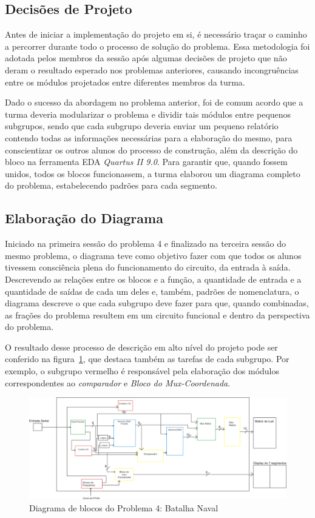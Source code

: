\documentclass[12pt]{article}
\begin{document}
\subsection{Decisões de Projeto}

Antes de iniciar a implementação do projeto em si, é necessário traçar o caminho a percorrer durante todo o processo de solução do problema. Essa metodologia foi adotada pelos membros da sessão após algumas decisões de projeto que não deram o resultado esperado nos problemas anteriores, causando incongruências entre os módulos projetados entre diferentes membros da turma. 

Dado o sucesso da abordagem no problema anterior, foi de comum acordo  que a turma deveria modularizar o problema e dividir tais módulos entre pequenos subgrupos, sendo que cada subgrupo deveria enviar um pequeno relatório contendo todas as informações necessárias para a elaboração do mesmo, para conscientizar os outros alunos do processo de construção, além da descrição do bloco na ferramenta EDA \textit{Quartus II 9.0}. Para garantir que, quando fossem unidos, todos os blocos funcionassem, a turma elaborou um diagrama completo do problema, estabelecendo padrões para cada segmento.

\subsection{Elaboração do Diagrama}
Iniciado na primeira sessão do problema 4 e finalizado na terceira sessão do mesmo problema, o diagrama teve como objetivo fazer com que todos os alunos tivessem consciência plena do funcionamento do circuito, da entrada à saída. Descrevendo as relações entre os blocos e a função, a quantidade de entrada e a quantidade de saídas de cada um deles e, também,  padrões de nomenclatura, o diagrama descreve o que cada subgrupo deve fazer para que, quando combinadas, as frações do problema resultem em um circuito funcional e dentro da perspectiva do problema. 

O resultado desse processo de descrição em alto nível do projeto pode ser conferido na figura~\ref{fig:diagrama}, que destaca também as tarefas de cada subgrupo. Por exemplo, o subgrupo vermelho é responsável pela elaboração dos módulos correspondentes ao \textit{comparador} e \textit{Bloco do Mux-Coordenada}.

\begin{figure}[h]
\centering
\includegraphics[width=1\textwidth]{img/p4/diagrama.png}
\caption{Diagrama de blocos do Problema 4: Batalha Naval}
\label{fig:diagrama}
\end{figure}
\end{document}
